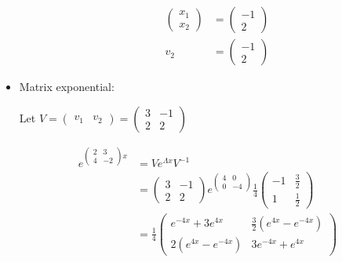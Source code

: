 \begin{itemize}
\begin{enumerate}
\begin{displaymath}
\begin{aligned}
                        \begin{pmatrix} x_1 \\ x_2 \end{pmatrix} & = \begin{pmatrix} -1 \\ 2 \end{pmatrix} \\
                        v_2 & = \begin{pmatrix} -1 \\ 2 \end{pmatrix}
                    \end{aligned}
                \end{displaymath}
        \end{enumerate}
    \item Matrix exponential:
        
        Let $V = \begin{pmatrix} v_1 & v_2 \end{pmatrix} = \begin{pmatrix} 3 & -1 \\ 2 & 2 \end{pmatrix}$

        \begin{displaymath}
            \begin{aligned}
                e^{\begin{pmatrix} 2 & 3 \\ 4 & -2 \end{pmatrix}x} & = V e^{\Lambda x} V^{-1} \\
                & = \begin{pmatrix} 3 & -1 \\ 2 & 2 \end{pmatrix} e^{\begin{pmatrix} 4 & 0 \\ 0 & -4 \end{pmatrix}} \frac{1}{4} \begin{pmatrix} -1 & \frac{3}{2} \\ 1 & \frac{1}{2} \end{pmatrix} \\
                & = \frac{1}{4} \begin{pmatrix} e^{-4x} + 3e^{4x} & \frac{3}{2} (e^{4x} - e^{-4x}) \\ 2(e^{4x} - e^{-4x}) & 3e^{-4x} + e^{4x} \end{pmatrix}
            \end{aligned}
        \end{displaymath}
\end{itemize}

